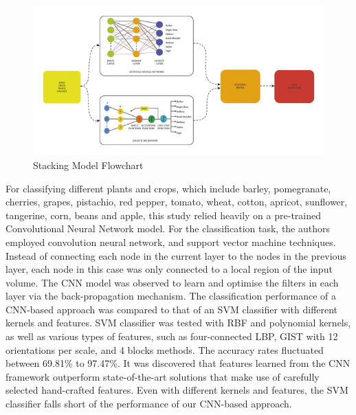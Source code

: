 \documentclass[conference]{IEEEtran}
\begin{document}
\begin{figure}[h!]
    \centering
    \includegraphics{StackingModelFlowChart.jpg}
    \caption[width=8cm]{\cite{b3} Stacking Model Flowchart}
    \label{fig:StackingModelFlowchart}
\end{figure}

For classifying different plants and crops, which include barley, pomegranate, cherries, grapes, pistachio, red pepper, tomato, wheat, cotton, apricot, sunflower, tangerine, corn, beans and apple, this \cite{b4} study relied heavily on a pre-trained Convolutional Neural Network model. For the classification task, the authors employed convolution neural network, and support vector machine techniques. Instead of connecting each node in the current layer to the nodes in the previous layer, each node in this case was only connected to a local region of the input volume. The CNN model was observed to learn and optimise the filters in each layer via the back-propagation mechanism. The classification performance of a CNN-based approach was compared to that of an SVM classifier with different kernels and features. SVM classifier was tested with RBF and polynomial kernels, as well as various types of features, such as four-connected LBP, GIST with 12 orientations per scale, and 4 blocks methods. The accuracy rates fluctuated between 69.81\% to 97.47\%. It was discovered that features learned from the CNN framework outperform state-of-the-art solutions that make use of carefully selected hand-crafted features. Even with different kernels and features, the SVM classifier falls short of the performance of our CNN-based approach.
\end{document}
